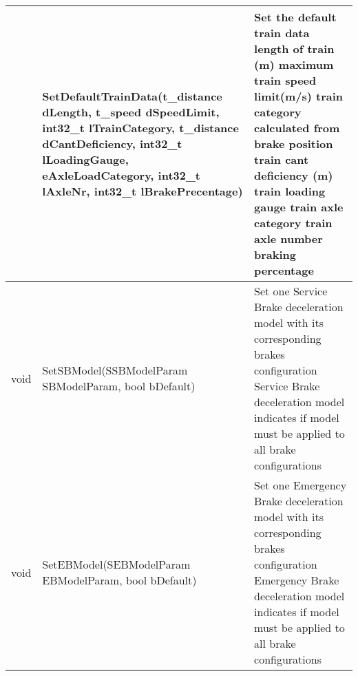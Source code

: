 \documentclass{template/openetcs_article}
\begin{document}
\begin{longtable}{|l|l|l|}
	&	\begin{minipage}[t]{0.50\linewidth} SetDefaultTrainData(t\_distance dLength, t\_speed dSpeedLimit, int32\_t lTrainCategory, t\_distance dCantDeficiency, int32\_t lLoadingGauge, eAxleLoadCategory, int32\_t lAxleNr, int32\_t lBrakePrecentage) \end{minipage} 
	&	\begin{minipage}[t]{0.45\linewidth} Set the default train data
	\newline [in] length of train (m)
	\newline [in] maximum train speed limit(m/s)
	\newline [in] train category calculated from brake position
	\newline [in] train cant deficiency (m)
	\newline [in] train loading gauge
	\newline [in] train axle category
	\newline [in] train axle number
	\newline [in] braking percentage\end{minipage} \\
	\hline
		\begin{minipage}[t]{0.10\linewidth} void \end{minipage} 
	&	\begin{minipage}[t]{0.50\linewidth} SetSBModel(SSBModelParam SBModelParam, bool bDefault) \end{minipage} 
	&	\begin{minipage}[t]{0.45\linewidth} Set one Service Brake deceleration model with its corresponding brakes configuration
	\newline [in] Service Brake deceleration model
	\newline [in] indicates if model must be applied to all brake configurations\end{minipage} \\
	\hline
		\begin{minipage}[t]{0.10\linewidth} void \end{minipage} 
	&	\begin{minipage}[t]{0.50\linewidth} SetEBModel(SEBModelParam EBModelParam, bool bDefault) \end{minipage} 
	&	\begin{minipage}[t]{0.45\linewidth} Set one Emergency Brake deceleration model with its corresponding brakes configuration
	\newline [in] Emergency Brake deceleration model
	\newline [in] indicates if model must be applied to all brake configurations\end{minipage} \\

\end{longtable}
\end{document}
